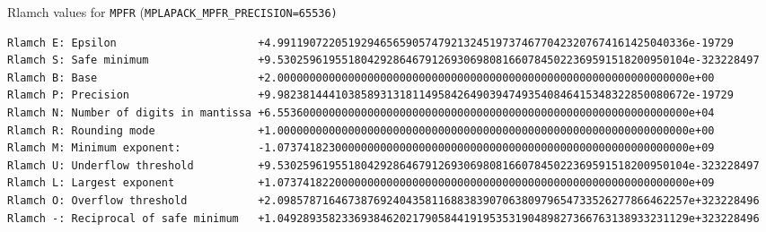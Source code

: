 \documentclass[12pt]{article}
\begin{document}
\begin{table}
\caption{Rlamch values for {\tt MPFR} ({\tt MPLAPACK\_MPFR\_PRECISION=65536)} }\label{rlamchmpfr_65536}
\begin{center}
\scriptsize
{
\begin{verbatim}
Rlamch E: Epsilon                      +4.9911907220519294656590574792132451973746770423207674161425040336e-19729
Rlamch S: Safe minimum                 +9.5302596195518042928646791269306980816607845022369591518200950104e-323228497
Rlamch B: Base                         +2.0000000000000000000000000000000000000000000000000000000000000000e+00
Rlamch P: Precision                    +9.9823814441038589313181149584264903947493540846415348322850080672e-19729
Rlamch N: Number of digits in mantissa +6.5536000000000000000000000000000000000000000000000000000000000000e+04
Rlamch R: Rounding mode                +1.0000000000000000000000000000000000000000000000000000000000000000e+00
Rlamch M: Minimum exponent:            -1.0737418230000000000000000000000000000000000000000000000000000000e+09
Rlamch U: Underflow threshold          +9.5302596195518042928646791269306980816607845022369591518200950104e-323228497
Rlamch L: Largest exponent             +1.0737418220000000000000000000000000000000000000000000000000000000e+09
Rlamch O: Overflow threshold           +2.0985787164673876924043581168838390706380979654733526277866462257e+323228496
Rlamch -: Reciprocal of safe minimum   +1.0492893582336938462021790584419195353190489827366763138933231129e+323228496
\end{verbatim}
}
\end{center}
\end{table}
\end{document}
